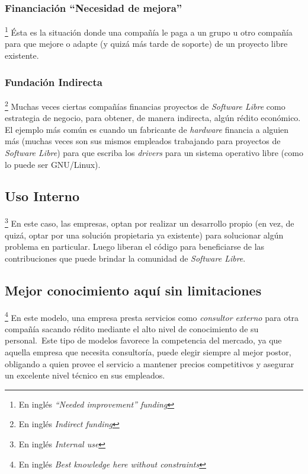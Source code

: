 \subsubsection{Financiaci\'on ``Necesidad de mejora''}\footnote{En ingl\'es
\emph{``Needed improvement'' funding}}
%
\'Esta es la situaci\'on donde una compa\~n\'ia le paga a un grupo u otro
compa\~n\'ia para que mejore o adapte (y quiz\'a m\'as tarde de soporte) de un
proyecto libre existente.

\subsubsection{Fundaci\'on Indirecta}\footnote{En ingl\'es \emph{Indirect
funding}}
%
Muchas veces ciertas compa\~n\'ias financias proyectos de \emph{Software Libre}
como estrategia de negocio, para obtener, de manera indirecta, alg\'un r\'edito
econ\'omico. El ejemplo m\'as com\'un es cuando un fabricante de
\emph{hardware}
financia a alguien m\'as (muchas veces son sus mismos empleados trabajando
para proyectos de \emph{Software Libre}) para que escriba los \emph{drivers}
para un sistema operativo libre (como lo puede ser GNU/Linux). 

\subsection{Uso Interno}\footnote{En ingl\'es \emph{Internal use}}
%
En este caso, las empresas, optan por realizar un desarrollo propio (en vez,
de quiz\'a, optar por una soluci\'on propietaria ya existente) para solucionar
alg\'un problema en particular. Luego liberan el c\'odigo para beneficiarse de
las contribuciones que puede brindar la comunidad de \emph{Software Libre}.

\subsection{Mejor conocimiento aqu\'i sin limitaciones}\footnote{En ingl\'es
\emph{Best knowledge here without constraints}}
%
En este modelo, una empresa presta servicios como \emph{consultor externo} para
otra compa\~n\'ia sacando r\'edito mediante el alto nivel de conocimiento de su
personal.\
Este tipo de modelos favorece la competencia del mercado, ya que aquella
empresa que necesita consultor\'ia, puede elegir siempre al mejor postor,
obligando a quien provee el servicio a mantener precios competitivos y
asegurar un excelente nivel t\'ecnico en sus empleados.\\

